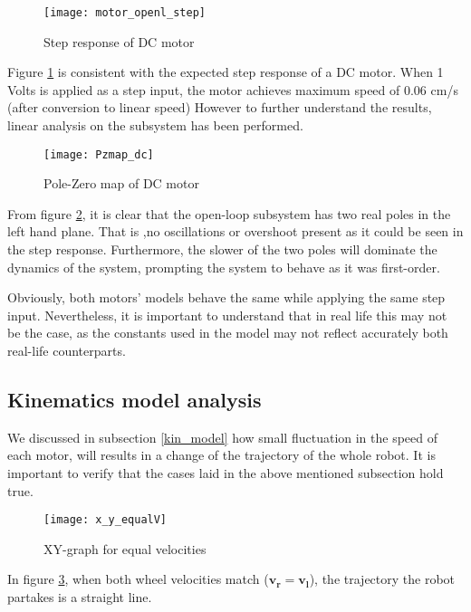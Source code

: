 \begin{figure}[h]
\centering
\texttt{[image: motor\_openl\_step]}
\caption{Step response of DC motor}
\label{fig::dc_step}
\end{figure} 

Figure \ref{fig::dc_step} is consistent with the expected step response of a DC motor. When 1 Volts is applied as a step input, the motor achieves maximum speed of 0.06 cm/s (after conversion to linear speed) However to further understand the results, linear analysis on the subsystem has been performed.

\begin{figure}[h]
\centering
\texttt{[image: Pzmap\_dc]}
\caption{Pole-Zero map of DC motor}
\label{fig::dc_pz}
\end{figure} 

From figure \ref{fig::dc_pz}, it is clear that the open-loop subsystem has two real poles in the left hand plane. That is ,no oscillations or overshoot present as it could be seen in the step response. Furthermore, the slower of the two poles will dominate the dynamics of the system, prompting the system to behave as it was first-order. 

Obviously, both motors' models behave the same while applying the same step input. Nevertheless, it is important to understand that in real life this may not be the case, as the constants used in the model may not reflect accurately both real-life counterparts.

\subsection{Kinematics model analysis} 

We discussed in subsection \ref{kin_model} how small fluctuation in the speed of each motor, will results in a change of the trajectory of the whole robot. It is important to verify that the cases laid in the above mentioned subsection hold true.

\newpage

\begin{figure}[h]
\centering
\texttt{[image: x\_y\_equalV]}
\caption{XY-graph for equal velocities}
\label{fig::v_l=v_r}
\end{figure} 

In figure \ref{fig::v_l=v_r}, when both wheel velocities match ($\boldsymbol{v_r = v_l}$), the trajectory the robot partakes is a straight line. 

